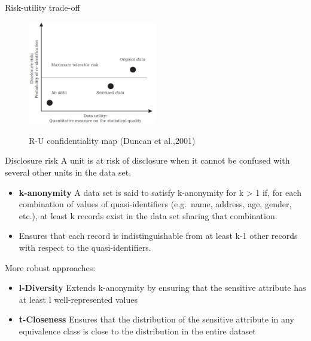 \documentclass[
	11pt, %
]{beamer}
\begin{document}
\begin{frame}{Risk-utility trade-off}
\label{risk-utility-trade-off}
\begin{figure}[H]

{\centering \includegraphics[width=0.5\textwidth,height=\textheight]{gallery/R-U confidentiality map.png}}

\caption{R-U confidentiality map (Duncan et al.,2001)}

\end{figure}%
\end{frame}

\begin{frame}{Disclosure risk}
\label{disclosure-risk}
A unit is at risk of disclosure when it cannot be confused with several
other units in the data set.

\begin{itemize}
\item
  \textbf{k-anonymity} A data set is said to satisfy k-anonymity for k
  \textgreater{} 1 if, for each combination of values of
  quasi-identifiers (e.g.~name, address, age, gender, etc.), at least k
  records exist in the data set sharing that combination.
\item
  Ensures that each record is indistinguishable from at least k-1 other
  records with respect to the quasi-identifiers.
\end{itemize}

More robust approaches:

\begin{itemize}
\item
  \textbf{l-Diversity} Extends k-anonymity by ensuring that the
  sensitive attribute has at least l well-represented values
\item
  \textbf{t-Closeness} Ensures that the distribution of the sensitive
  attribute in any equivalence class is close to the distribution in the
  entire dataset
\end{itemize}
\end{frame}
\end{document}
